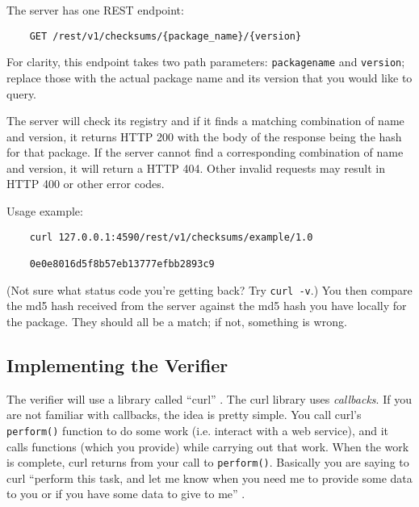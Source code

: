 \documentclass[12pt]{article}
\renewcommand{\_}{\kern-1.5pt\textunderscore\kern-1.5pt}
\begin{document}
\vspace{1em}
The server has one REST endpoint: 
\begin{verbatim}
    GET /rest/v1/checksums/{package_name}/{version}
\end{verbatim}

For clarity, this endpoint takes two path parameters: \texttt{package\_name} and \texttt{version}; replace those with the actual package name and its version that you would like to query.\par

\vspace{1em}
The server will check its registry and if it finds a matching combination of name and version, it returns HTTP 200 with the body of the response being the hash for that package. If the server cannot find a corresponding combination of name and version, it will return a HTTP 404. Other invalid requests may result in HTTP 400 or other error codes. \par

\vspace{1em}
Usage example:

\begin{verbatim}
    curl 127.0.0.1:4590/rest/v1/checksums/example/1.0

    0e0e8016d5f8b57eb13777efbb2893c9
\end{verbatim}

(Not sure what status code you're getting back? Try \verb+curl -v+.) You then compare the md5 hash received from the server against the md5 hash you have locally for the package. They should all be a match; if not, something is wrong.

\subsection*{Implementing the Verifier}

\vspace{1em}
The verifier will use a library called ``curl'' . The curl library uses \textit{callbacks}. If you are not familiar with callbacks, the idea is pretty simple. You call curl's \texttt{perform()} function to do some work (i.e. interact with a web service), and it calls functions (which you provide) while carrying out that work. When the work is complete, curl returns from your call to \texttt{perform()}. Basically you are saying to curl ``perform this task, and let me know when you need me to provide some data to you or if you have some data to give to me'' .\par
\end{document}
